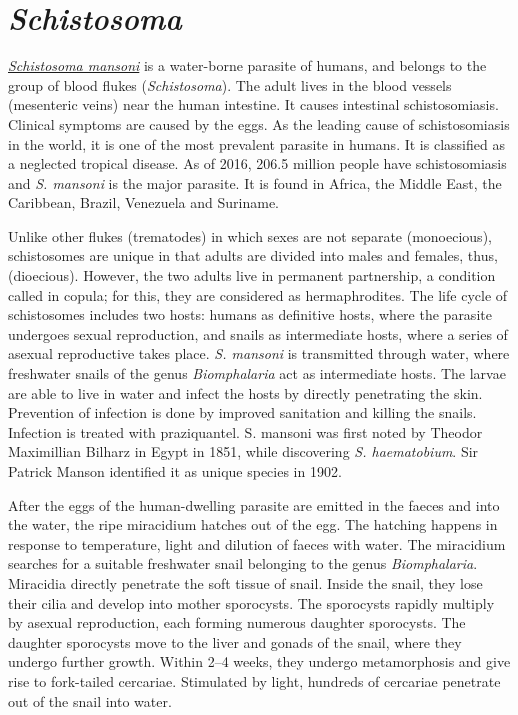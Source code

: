 \section{\texorpdfstring{
\emph{Schistosoma}}{Schistosoma}}\label{Schistosoma}


\href{https://en.wikipedia.org/wiki/Schistosoma_mansoni}{\emph{Schistosoma
mansoni}} is a water-borne parasite of humans, and belongs to the group
of blood flukes (\emph{Schistosoma}). The adult lives in the blood vessels
(mesenteric veins) near the human intestine. It causes intestinal
schistosomiasis. Clinical symptoms are caused by the eggs. As the
leading cause of schistosomiasis in the world, it is one of the most prevalent
parasite in humans. It is classified as a neglected tropical disease. As
of 2016, 206.5 million people have schistosomiasis and \emph{S. mansoni} is the
major parasite. It is found in Africa, the Middle East, the Caribbean,
Brazil, Venezuela and Suriname.

Unlike other flukes (trematodes) in which sexes are not separate
(monoecious), schistosomes are unique in that adults are divided into
males and females, thus, (dioecious). However, the two adults live in
permanent partnership, a condition called in copula; for this, they are
considered as hermaphrodites. The life cycle of schistosomes includes
two hosts: humans as definitive hosts, where the parasite undergoes
sexual reproduction, and snails as intermediate hosts, where a series of
asexual reproductive takes place. \emph{S. mansoni} is transmitted through
water, where freshwater snails of the genus \emph{Biomphalaria} act as
intermediate hosts. The larvae are able to live in water and infect the
hosts by directly penetrating the skin. Prevention of infection is done
by improved sanitation and killing the snails. Infection is treated with
praziquantel. S. mansoni was first noted by Theodor Maximillian Bilharz
in Egypt in 1851, while discovering \emph{S. haematobium}. Sir Patrick Manson
identified it as unique species in 1902.

After the eggs of the human-dwelling parasite are emitted in the faeces
and into the water, the ripe miracidium hatches out of the egg. The
hatching happens in response to temperature, light and dilution of
faeces with water. The miracidium searches for a suitable freshwater
snail belonging to the genus \emph{Biomphalaria}. Miracidia directly penetrate
the soft tissue of snail. Inside the snail, they lose their cilia and
develop into mother sporocysts. The sporocysts rapidly multiply by
asexual reproduction, each forming numerous daughter sporocysts. The
daughter sporocysts move to the liver and gonads of the snail, where
they undergo further growth. Within 2--4 weeks, they undergo
metamorphosis and give rise to fork-tailed cercariae. Stimulated by
light, hundreds of cercariae penetrate out of the snail into water.

